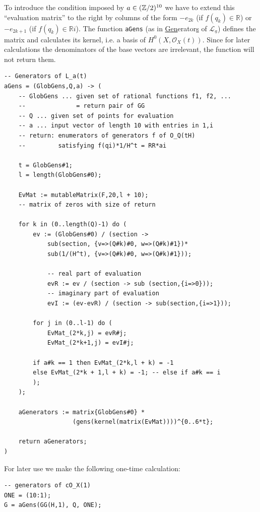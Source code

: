 \documentclass[a4paper,10pt]{amsart}
\theoremstyle{definition}
\theoremstyle{plain}
\newcommand{\cL}{{\mathcal L}}
\newcommand{\cO}{{\mathcal O}}
\newcommand{\R}{{\mathbb R}}
\newcommand{\Z}{{\mathbb Z}}
\begin{document}
To introduce the condition imposed by $a \in (\Z/2\/)^{10}$ we have to extend this ``evaluation matrix'' to the right by columns of the form $- e_{2k}$ (if $f(q_k) \in \R$) or $- e_{2k+1}$ (if $f(q_k) \in \R i$). The function \texttt{aGens} (as in \underline{Gen}erator\underline{s} of $\cL_{\underline{a}}$) defines the matrix and calculates its kernel, i.e. a basis of $H^0(X, \cO_X(t))$. Since for later calculations the denominators of the base vectors are irrelevant, the function will not return them.

\begin{oframed}
\begin{verbatim}
-- Generators of L_a(t)
aGens = (GlobGens,Q,a) -> (
    -- GlobGens ... given set of rational functions f1, f2, ...
    --              = return pair of GG
    -- Q ... given set of points for evaluation
    -- a ... input vector of length 10 with entries in 1,i
    -- return: enumerators of generators f of O_Q(tH)
    --         satisfying f(qi)*1/H^t = RR*ai

    t = GlobGens#1;
    l = length(GlobGens#0);
    
    EvMat := mutableMatrix(F,20,l + 10);
    -- matrix of zeros with size of return
    
    for k in (0..length(Q)-1) do (
        ev := (GlobGens#0) / (section ->
            sub(section, {v=>(Q#k)#0, w=>(Q#k)#1})*
            sub(1/(H^t), {v=>(Q#k)#0, w=>(Q#k)#1}));

            -- real part of evaluation
            evR := ev / (section -> sub (section,{i=>0}));
            -- imaginary part of evaluation
            evI := (ev-evR) / (section -> sub(section,{i=>1}));
            
        for j in (0..l-1) do (
            EvMat_(2*k,j) = evR#j;
            EvMat_(2*k+1,j) = evI#j;

        if a#k == 1 then EvMat_(2*k,l + k) = -1
        else EvMat_(2*k + 1,l + k) = -1; -- else if a#k == i
        );
    );

    aGenerators := matrix{GlobGens#0} *
                   (gens(kernel(matrix(EvMat))))^{0..6*t};
    
    return aGenerators;
)
\end{verbatim}
\end{oframed}

For later use we make the following one-time calculation:
\begin{oframed}
\begin{verbatim}
-- generators of cO_X(1)
ONE = (10:1);
G = aGens(GG(H,1), Q, ONE);
\end{verbatim}
\end{oframed}
\end{document}
